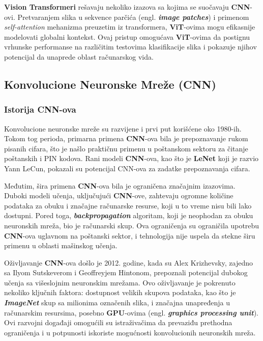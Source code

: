 \documentclass[12pt]{article}
\begin{document}
   \textbf{Vision Transformeri} rešavaju nekoliko izazova sa kojima se suočavaju \textbf{CNN}-ovi. 
   Pretvaranjem slika u sekvence parčića (engl. \textbf{\textit{image patches}}) i primenom \textit{self-attention} mehanizma preuzetim iz transformera, 
   \textbf{ViT}-ovima mogu efikasnije modelovati globalni kontekst. 
   Ovaj pristup omogućava \textbf{ViT}-ovima da postignu vrhunske performanse na različitim  
   testovima klasifikacije slika i pokazuje njihov potencijal da unaprede oblast računarskog vida.

   \subsection{Konvolucione Neuronske Mreže (\textbf{CNN})}
   \subsubsection{Istorija \textbf{CNN}-ova}
   Konvolucione neuronske mreže su razvijene 
   i prvi put korišćene oko 1980-ih. Tokom tog perioda, primarna primena 
   \textbf{CNN}-ova bila je prepoznavanje rukom pisanih cifara, što je našlo 
   praktičnu primenu u poštanskom sektoru za čitanje poštanskih i PIN kodova. 
   Rani modeli \textbf{CNN}-ova, kao što je \textbf{LeNet} \cite{lenet} koji je razvio Yann LeCun, pokazali su 
   potencijal CNN-ova za zadatke prepoznavanja cifara.

   Međutim, šira primena \textbf{CNN}-ova bila je ograničena značajnim izazovima. 
   Duboki modeli učenja, uključujući \textbf{CNN}-ove, zahtevaju ogromne količine 
   podataka za obuku i značajne računarske resurse, koji u to vreme nisu 
   bili lako dostupni. Pored toga, \textbf{\textit{backpropagation}} algoritam, 
   koji je neophodan za obuku neuronskih mreža, bio je računarski skup. 
   Ova ograničenja su ograničila upotrebu \textbf{CNN}-ova uglavnom na poštanski sektor, 
   i tehnologija nije uspela da stekne širu primenu u oblasti mašinskog učenja.

   Oživljavanje \textbf{CNN}-ova došlo je 2012. godine, kada su Alex Krizhevsky, zajedno 
   sa Ilyom Sutskeverom i Geoffreyjem Hintonom, prepoznali potencijal dubokog 
   učenja sa višeslojnim neuronskim mrežama. Ovo oživljavanje je pokrenuto nekoliko 
   ključnih faktora: dostupnost velikih skupova podataka, kao što je \textbf{\textit{ImageNet}} \cite{imagenet} skup sa 
   milionima označenih slika, i značajna unapređenja u računarskim resursima, posebno \textbf{GPU}-ovima 
   (engl. \textbf{\textit{graphics processing unit}}). Ovi razvojni događaji omogućili su istraživačima da prevaziđu prethodna ograničenja i u 
   potpunosti iskoriste mogućnosti konvolucionih neuronskih mreža.
\end{document}
